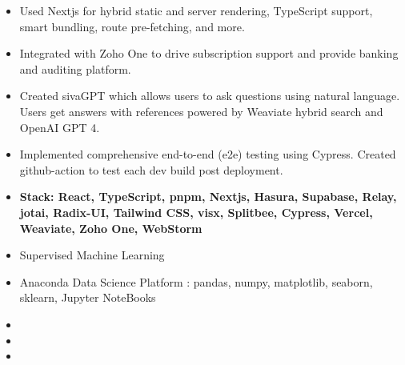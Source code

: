 \documentclass[10pt,a4paper,ragged2e,withhyper]{altacv}
\begin{document}
\begin{paracol}{2}
\begin{itemize}
\item Used Nextjs for hybrid static and server rendering, TypeScript support, smart bundling, route pre-fetching, and more.
\item Integrated with Zoho One to drive subscription support and provide banking and auditing platform.
\item Created sivaGPT which allows users to ask questions using natural language.
      Users get answers with references powered by Weaviate hybrid search and OpenAI GPT 4.
\item Implemented comprehensive end-to-end (e2e) testing using Cypress.
      Created github-action to test each dev build post deployment.
\item \textbf{Stack: React, TypeScript, pnpm, Nextjs, Hasura, Supabase, Relay, jotai, Radix-UI, Tailwind CSS, visx, Splitbee, Cypress, Vercel, Weaviate, Zoho One, WebStorm}
\end{itemize}

\bigskip

\medskip
{}
\begin{itemize}
\smallskip
\item Supervised Machine Learning
\item Anaconda Data Science Platform : pandas, numpy, matplotlib, seaborn, sklearn, Jupyter NoteBooks
\end{itemize}


\bigskip
{}
\begin{itemize}
\item{}
\smallskip
\item{}
\smallskip
\item{}
\end{itemize}









\end{paracol}
\end{document}
